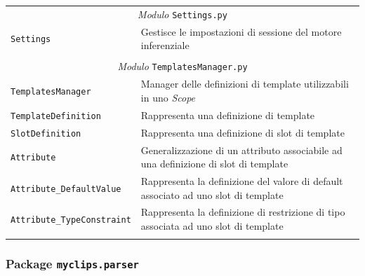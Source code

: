 \begin{longtable}{p{5.5cm}p{6.5cm}}
\multicolumn{2}{c}{\emph{Modulo} \texttt{Settings.py}}\\
	\hdashline[5pt/5pt]
		\texttt{Settings} & Gestisce le impostazioni di sessione del motore inferenziale\\ 
	\hline\\

\multicolumn{2}{c}{\emph{Modulo} \texttt{TemplatesManager.py}}\\
	\hdashline[5pt/5pt]
		\texttt{TemplatesManager} & Manager delle definizioni di template utilizzabili in uno \emph{Scope}\\ 
	\hdashline[1pt/5pt]
		\texttt{TemplateDefinition} & Rappresenta una definizione di template\\ 
	\hdashline[1pt/5pt]
		\texttt{SlotDefinition} & Rappresenta una definizione di slot di template\\ 
	\hdashline[1pt/5pt]
		\texttt{Attribute} & Generalizzazione di un attributo associabile ad una definizione di slot di template\\ 
	\hdashline[1pt/5pt]
		\texttt{Attribute\_DefaultValue} & Rappresenta la definizione del valore di default associato ad uno slot di template\\ 
	\hdashline[1pt/5pt]
		\texttt{Attribute\_TypeConstraint} & Rappresenta la definizione di restrizione di tipo associata ad uno slot di template\\ 
	\hline\\

\end{longtable} 


\subsubsection{Package \texttt{myclips.parser}}

